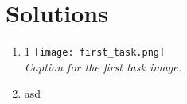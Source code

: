 \documentclass{article}
\begin{document}

\section*{Solutions}
\begin{enumerate}
        \item 1 \makebox[0pt][l]{} %
        \centering
        \texttt{[image: first\_task.png]} \\
        \textit{Caption for the first task image.} %
    
        \item asd
\end{enumerate}
\end{document}
